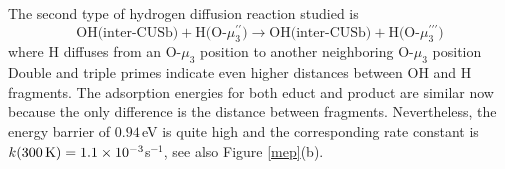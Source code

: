 \documentclass[11pt,DIV=13,BCOR=5mm,a4paper,headinclude]{scrbook}
\begin{document}

The second type of hydrogen diffusion reaction studied is
\begin{equation}
 \text{OH(inter-CUSb)} + \text{H(O-$\mu_3^{\prime\prime}$)} \rightarrow \text{OH(inter-CUSb)} + \text{H(O-$\mu_3^{\prime\prime\prime}$)} \tag{Df-H-VI}
     \label{diffHd}
\end{equation}
where H diffuses from an O-$\mu_3$ position to another neighboring O-$\mu_3$ position
Double and triple primes indicate even higher distances between OH and H fragments.
The adsorption energies for both educt and product are similar now because the only difference is the distance between fragments.
Nevertheless, the energy barrier of $0.94\,$eV is quite high and the corresponding rate constant is $k(\textrm{300\,K})=1.1\times 10^{-3}$s$^{-1}$, see also Figure \ref{mep}(b).
% 
\end{document}
